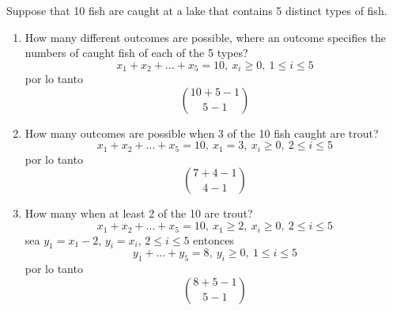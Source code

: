 \item Suppose that 10 fish are caught at a lake that contains 5 distinct types of fish.
\begin{enumerate}
    \item How many different outcomes are possible, where an outcome specifies the numbers of caught fish of each of the 5 types?
    \[ x_1 + x_2 + \dots + x_5 = 10,\ x_i \ge 0,\ 1 \le i \le 5 \]
    por lo tanto
    \[ \binom{10+5-1}{5-1} \]
    \item How many outcomes are possible when 3 of the 10 fish caught are trout?
    \[ x_1 + x_2 + \dots + x_5 = 10,\ x_1 = 3,\ x_i \ge 0,\ 2 \le i \le 5 \]
    por lo tanto
    \[ \binom{7+4-1}{4-1} \]
    \item How many when at least 2 of the 10 are trout?
    \[ x_1 + x_2 + \dots + x_5 = 10,\ x_1 \ge 2,\ x_i \ge 0,\ 2 \le i \le 5 \]
    sea $y_1 = x_1 - 2$, $y_i = x_i$, $2 \le i \le 5$ entonces
    \[ y_1 + \dots + y_5 = 8,\ y_i \ge 0,\ 1 \le i \le 5 \]
    por lo tanto
    \[ \binom{8+5-1}{5-1} \]
\end{enumerate}